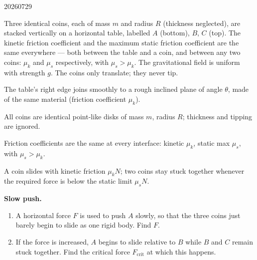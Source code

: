 

\begin{problem}{20260729}

Three identical coins, each of mass $m$ and radius $R$ (thickness neglected), are stacked vertically on a horizontal table, labelled $A$ (bottom), $B$, $C$ (top).  The kinetic friction coefficient and the maximum static friction coefficient are the same everywhere --- both between the table and a coin, and between any two coins: $\mu_k$ and $\mu_s$ respectively, with $\mu_s > \mu_k$.  The gravitational field is uniform with strength $g$.  The coins only translate; they never tip.

The table's right edge joins smoothly to a rough inclined plane of angle $\theta$, made of the same material (friction coefficient $\mu_k$).

\begin{assumptions}
  \item All coins are identical point-like disks of mass $m$, radius $R$; thickness and tipping are ignored.
  \item Friction coefficients are the same at every interface: kinetic $\mu_k$, static max $\mu_s$, with $\mu_s > \mu_k$.
  \item A coin slides with kinetic friction $\mu_k N$; two coins stay stuck together whenever the required force is below the static limit $\mu_s N$.
\end{assumptions}

\begin{questions}
  \item \textbf{Slow push.}
        \begin{enumerate}[label=\arabic*.]
          \item A horizontal force $F$ is used to push $A$ slowly, so that the three coins just barely begin to slide as one rigid body.  Find $F$.
          \item If the force is increased, $A$ begins to slide relative to $B$ while $B$ and $C$ remain stuck together.  Find the critical force $F_{\text{crit}}$ at which this happens.
        \end{enumerate}


\end{questions}
\end{problem}

